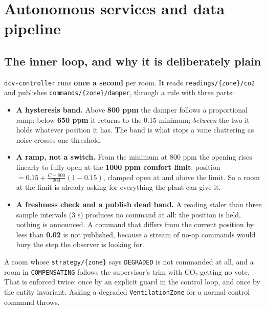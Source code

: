 \section{Autonomous services and data pipeline}\label{sec:7}

\subsection{The inner loop, and why it is deliberately plain}\label{sec:7.1}

\texttt{dcv-controller} runs \textbf{once a second} per room. It reads
\texttt{readings/\{zone\}/co2} and publishes \texttt{commands/\{zone\}/damper}, through a rule with
three parts:

\begin{itemize}
\tightlist
\item \textbf{A hysteresis band.} Above \textbf{800 ppm} the damper follows a proportional ramp;
  below \textbf{650 ppm} it returns to the 0.15 minimum; \emph{between} the two it holds whatever
  position it has. The band is what stops a vane chattering as noise crosses one threshold.
\item \textbf{A ramp, not a switch.} From the minimum at 800 ppm the opening rises linearly to
  fully open at the \textbf{1000 ppm comfort limit}: position
  $= 0.15 + \frac{C - 800}{200}(1 - 0.15)$, clamped open at and above the limit. So a room at the
  limit is already asking for everything the plant can give it.
\item \textbf{A freshness check and a publish dead band.} A reading staler than three sample
  intervals (3 s) produces no command at all: the position is held, nothing is announced. A
  command that differs from the current position by less than \textbf{0.02} is not published,
  because a stream of no-op commands would bury the step the observer is looking for.
\end{itemize}

A room whose \texttt{strategy/\{zone\}} says \texttt{DEGRADED} is not commanded at all, and a room
in \texttt{COMPENSATING} follows the supervisor's trim with CO₂ getting no vote. That is enforced
twice: once by an explicit guard in the control loop, and once by the entity invariant. Asking a
degraded \texttt{VentilationZone} for a normal control command throws.

